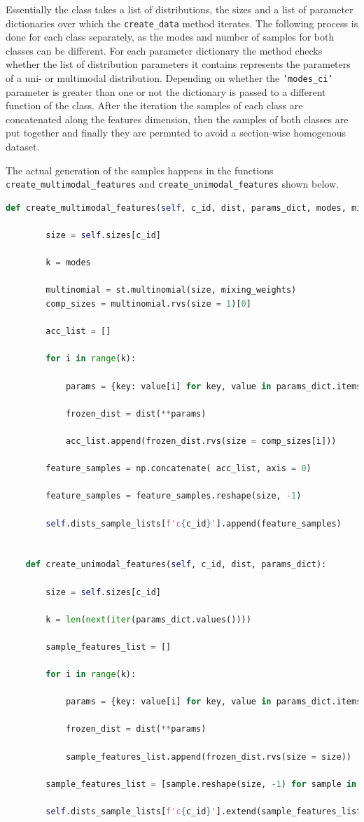 Essentially the class takes a list of distributions, the sizes and a list of parameter dictionaries over which the \texttt{create\_data} method iterates.
The following process is done for each class separately, as the modes and number of samples for both classes can be different.
For each parameter dictionary the method checks whether the list of distribution parameters it contains represents the parameters of a uni- or multimodal distribution.
Depending on whether the \texttt{'modes\_ci'} parameter is greater than one or not the dictionary is passed to a different function of the class.
After the iteration the samples of each class are concatenated along the features dimension, then the samples of both classes are put together and finally they are
permuted to avoid a section-wise homogenous dataset.

The actual generation of the samples happens in the functions \texttt{create\_multimodal\_features} and \texttt{create\_unimodal\_features} shown below.

\begin{lstlisting}[language=Python, numbers=none]
    def create_multimodal_features(self, c_id, dist, params_dict, modes, mixing_weights):

        size = self.sizes[c_id]

        k = modes

        multinomial = st.multinomial(size, mixing_weights)
        comp_sizes = multinomial.rvs(size = 1)[0]

        acc_list = []

        for i in range(k):

            params = {key: value[i] for key, value in params_dict.items()}

            frozen_dist = dist(**params)

            acc_list.append(frozen_dist.rvs(size = comp_sizes[i]))

        feature_samples = np.concatenate( acc_list, axis = 0)

        feature_samples = feature_samples.reshape(size, -1)

        self.dists_sample_lists[f'c{c_id}'].append(feature_samples)
        

    def create_unimodal_features(self, c_id, dist, params_dict):

        size = self.sizes[c_id]

        k = len(next(iter(params_dict.values())))

        sample_features_list = []

        for i in range(k):

            params = {key: value[i] for key, value in params_dict.items()}

            frozen_dist = dist(**params)

            sample_features_list.append(frozen_dist.rvs(size = size))

        sample_features_list = [sample.reshape(size, -1) for sample in sample_features_list]

        self.dists_sample_lists[f'c{c_id}'].extend(sample_features_list)

\end{lstlisting}

